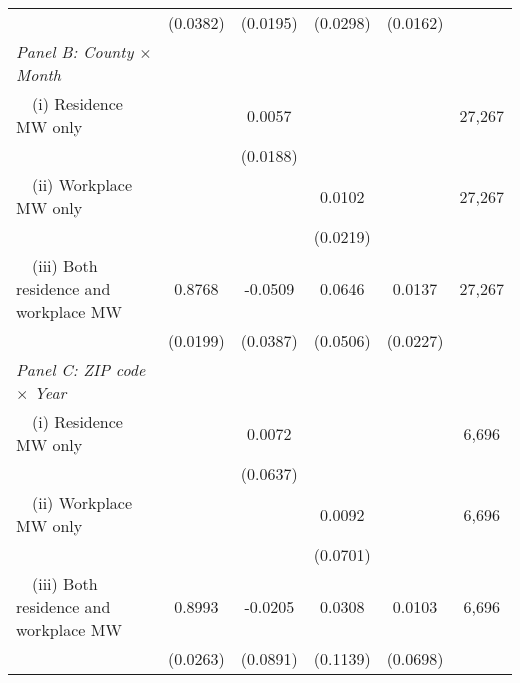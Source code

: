 \begin{landscape}
\begin{table}[ht!]
\begin{tabular}{@{}lccccc@{}}
                                                             & (0.0382) & (0.0195) & (0.0298) & (0.0162) &      \\
        \textit{Panel B: County $\times$ Month}              &       &       &       &       &      \\
        $\quad$(i) Residence MW only                         &       &  0.0057  &       &       & 27,267 \\
                                                             &       & (0.0188) &       &       &      \\
        $\quad$(ii) Workplace MW only                        &       &       &  0.0102  &       & 27,267 \\
                                                             &       &       & (0.0219) &       &      \\
        $\quad$(iii) Both residence and workplace MW         &  0.8768  &  -0.0509  &  0.0646  &  0.0137  & 27,267 \\
                                                             & (0.0199) & (0.0387) & (0.0506) & (0.0227) &      \\
        \textit{Panel C: ZIP code $\times$ Year}             &       &       &       &       &      \\
        $\quad$(i) Residence MW only                         &       &  0.0072  &       &       & 6,696 \\
                                                             &       & (0.0637) &       &       &      \\
        $\quad$(ii) Workplace MW only                        &       &       &  0.0092  &       & 6,696 \\
                                                             &       &       & (0.0701) &       &      \\
        $\quad$(iii) Both residence and workplace MW         &  0.8993  &  -0.0205  &  0.0308  &  0.0103  & 6,696 \\
                                                             & (0.0263) & (0.0891) & (0.1139) & (0.0698) &      \\ \bottomrule
    \end{tabular}
    

\end{table}
\end{landscape}
